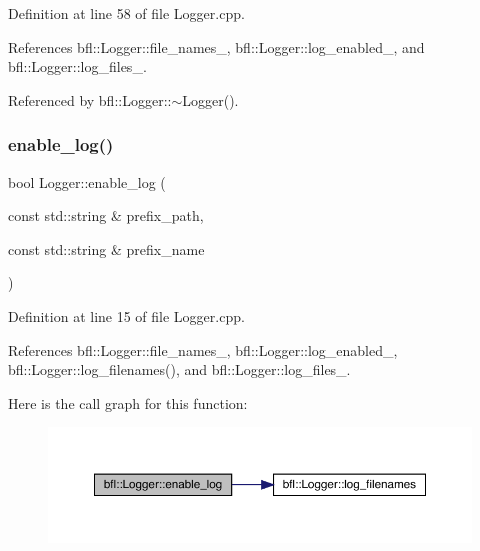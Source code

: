 Definition at line 58 of file Logger.\+cpp.



References bfl\+::\+Logger\+::file\+\_\+names\+\_\+, bfl\+::\+Logger\+::log\+\_\+enabled\+\_\+, and bfl\+::\+Logger\+::log\+\_\+files\+\_\+.



Referenced by bfl\+::\+Logger\+::$\sim$\+Logger().

\mbox{\label{classbfl_1_1Logger_ae94b97b6e8d7902e8ce048384813122e}} 
\subsubsection{\texorpdfstring{enable\+\_\+log()}{enable\_log()}}
{\footnotesize\ttfamily bool Logger\+::enable\+\_\+log (\begin{DoxyParamCaption}\item[{const std\+::string \&}]{prefix\+\_\+path,  }\item[{const std\+::string \&}]{prefix\+\_\+name }\end{DoxyParamCaption})\hspace{0.3cm}{\ttfamily [inherited]}}



Definition at line 15 of file Logger.\+cpp.



References bfl\+::\+Logger\+::file\+\_\+names\+\_\+, bfl\+::\+Logger\+::log\+\_\+enabled\+\_\+, bfl\+::\+Logger\+::log\+\_\+filenames(), and bfl\+::\+Logger\+::log\+\_\+files\+\_\+.

Here is the call graph for this function\+:
\nopagebreak
\begin{figure}[H]
\begin{center}
\leavevmode
\includegraphics[width=350pt]{classbfl_1_1Logger_ae94b97b6e8d7902e8ce048384813122e_cgraph}
\end{center}
\end{figure}
\mbox{\label{classbfl_1_1GaussianFilter_ae30a175454a93685eca79d3ef857f7bc}} 
